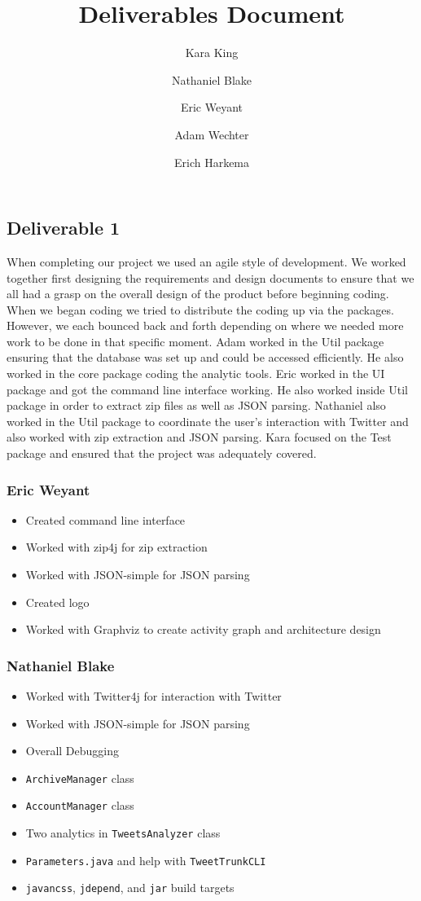 \documentclass[a4paper, 12pt]{article}
\title{Deliverables Document}
\author{Kara King\and Nathaniel Blake\and Eric Weyant\and Adam Wechter \and Erich Harkema}
\begin{document}
\maketitle

\subsection*{Deliverable 1} \label{sec:one}
\textit{} When completing our project we used an agile style of development. We worked together first designing the requirements and design documents to ensure that we all had a grasp on the overall design of the product before beginning coding. When we began coding we tried to distribute the coding up via the packages. However, we each bounced back and forth depending on where we needed more work to be done in that specific moment. Adam worked in the Util package ensuring that the database was set up and could be accessed efficiently. He also worked in the core package coding the analytic tools. Eric worked in the UI package and got the command line interface working. He also worked inside Util package in order to extract zip files as well as JSON parsing. Nathaniel also worked in the Util package to coordinate the user’s interaction with Twitter and also worked with zip extraction and JSON parsing. Kara focused on the Test package and ensured that the project was adequately covered. 

\subsubsection*{Eric Weyant}
\begin{itemize}
\item  Created command line interface
\item  Worked with zip4j for zip extraction
\item  Worked with JSON-simple for JSON parsing
\item  Created logo
\item  Worked with Graphviz to create activity graph and architecture design
\end{itemize}

\subsubsection*{Nathaniel Blake}
\begin{itemize}
\item Worked with Twitter4j for interaction with Twitter
\item Worked with JSON-simple for JSON parsing
\item Overall Debugging
\item \texttt{ArchiveManager} class
\item \texttt{AccountManager} class
\item Two analytics in \texttt{TweetsAnalyzer} class
\item \texttt{Parameters.java} and help with \texttt{TweetTrunkCLI}
\item \texttt{javancss}, \texttt{jdepend}, and \texttt{jar} build targets
\end{itemize}
\end{document}
